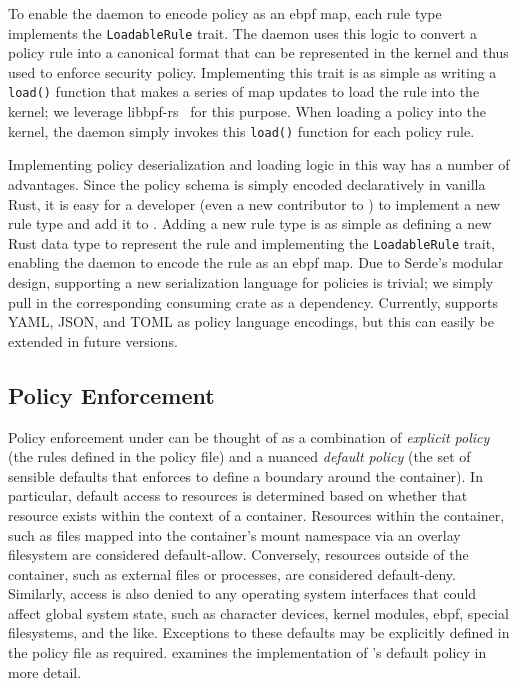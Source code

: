 To enable the daemon to encode policy as an \gls{ebpf} map, each rule type implements the
\texttt{LoadableRule} trait. The daemon uses this logic to convert a policy rule into
a canonical format that can be represented in the kernel and thus used to enforce security
policy. Implementing this trait is as simple as writing a \texttt{load()} function that
makes a series of map updates to load the rule into the kernel; we leverage
libbpf-rs~\cite{libbpf-rs} for this purpose. When loading a policy into the kernel, the
daemon simply invokes this \texttt{load()} function for each policy rule.

Implementing policy deserialization and loading logic in this way has a number of
advantages. Since the policy schema is simply encoded declaratively in vanilla Rust, it is
easy for a developer (even a new contributor to \bpfcontain{}) to implement a new rule
type and add it to \bpfcontain{}. Adding a new rule type is as simple as defining a new
Rust data type to represent the rule and implementing the \texttt{LoadableRule} trait,
enabling the daemon to encode the rule as an \gls{ebpf} map. Due to Serde's modular
design, supporting a new serialization language for \bpfcontain{} policies is trivial; we
simply pull in the corresponding consuming crate as a dependency. Currently, \bpfcontain{}
supports YAML, JSON, and TOML as policy language encodings, but this can easily be
extended in future versions.

\subsection{Policy Enforcement}%
\label{ss:bpfcontain-enforcement}

Policy enforcement under \bpfcontain{} can be thought of as a combination of
\textit{explicit policy} (the rules defined in the policy file) and a nuanced
\textit{default policy} (the set of sensible defaults that \bpfcontain{} enforces to
define a boundary around the container). In particular, default access to resources is
determined based on whether that resource exists within the context of a container.
Resources within the container, such as files mapped into the container's mount namespace
via an overlay filesystem are considered default-allow. Conversely, resources outside of
the container, such as external files or processes, are considered default-deny.
Similarly, access is also denied to any operating system interfaces that could affect
global system state, such as character devices, kernel modules, \gls{ebpf}, special
filesystems, and the like. Exceptions to these defaults may be explicitly defined in the
policy file as required.  examines the implementation of
\bpfcontain{}'s default policy in more detail.

